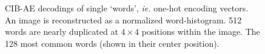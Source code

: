 \begin{figure}
    \caption{CIB-AE decodings of single `words', \emph{ie.} one-hot encoding vectors. An image is reconstructed as a normalized word-histogram.
             \protect{} 512 words are nearly duplicated at $4 \times 4$ positions within the image.
             \protect{} The 128 most common words (shown in their center position).}
    \label{fig:cibae-words}
\end{figure}

